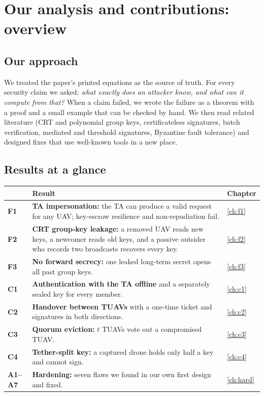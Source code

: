 \chapter{Our analysis and contributions: overview}\label{ch:p2overview}
\section{Our approach}
We treated the paper's printed equations as the source of truth. For every security claim we asked: \emph{what exactly does an attacker
know, and what can it compute from that?} When a claim failed, we wrote the failure as a theorem with a proof and a small example that can be checked
by hand. We then read related literature (CRT and polynomial group keys, certificateless signatures, batch verification, mediated and threshold
signatures, Byzantine fault tolerance) and designed fixes that use well-known tools in a new place.

\section{Results at a glance}
\begin{center}
\small
\begin{tabularx}{\linewidth}{@{}l X l@{}}
\toprule
& \textbf{Result} & \textbf{Chapter}\\
\midrule
\textcolor{bad}{\textbf{F1}} & \textbf{TA impersonation:} the TA can produce a valid request for any UAV; key-escrow resilience and non-repudiation fail. & \ref{ch:f1}\\
\textcolor{bad}{\textbf{F2}} & \textbf{CRT group-key leakage:} a removed UAV reads new keys, a newcomer reads old keys, and a passive outsider who records two
broadcasts recovers every key. & \ref{ch:f2}\\
\textcolor{bad}{\textbf{F3}} & \textbf{No forward secrecy:} one leaked long-term secret opens all past group keys. & \ref{ch:f3}\\
\midrule
\textcolor{uavc}{\textbf{C1}} & \textbf{Authentication with the TA offline} and a separately sealed key for every member. & \ref{ch:c1}\\
\textcolor{hoc}{\textbf{C2}} & \textbf{Handover between TUAVs} with a one-time ticket and signatures in both directions. & \ref{ch:c2}\\
\textcolor{quorum}{\textbf{C3}} & \textbf{Quorum eviction:} $t$ TUAVs vote out a compromised TUAV. & \ref{ch:c3}\\
\textcolor{tether}{\textbf{C4}} & \textbf{Tether-split key:} a captured drone holds only half a key and cannot sign. & \ref{ch:c4}\\
\textbf{A1--A7} & \textbf{Hardening:} seven flaws we found in our own first design and fixed. & \ref{ch:hard}\\
\bottomrule
\end{tabularx}
\end{center}


